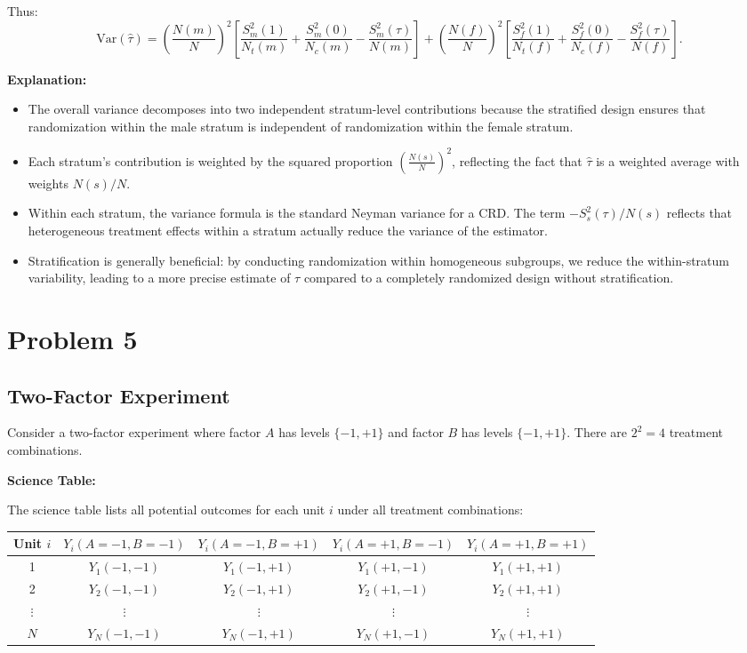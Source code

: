 \documentclass[11pt]{article}
\begin{document}
Thus:
\[
  \boxed{\text{Var}(\hat{\tau}) = \left(\frac{N(m)}{N}\right)^2 \left[\frac{S^2_m(1)}{N_t(m)} + \frac{S^2_m(0)}{N_c(m)} - \frac{S^2_m(\tau)}{N(m)}\right] + \left(\frac{N(f)}{N}\right)^2 \left[\frac{S^2_f(1)}{N_t(f)} + \frac{S^2_f(0)}{N_c(f)} - \frac{S^2_f(\tau)}{N(f)}\right].}
\]

\textbf{Explanation:}
\begin{itemize}
  \item The overall variance decomposes into two independent stratum-level contributions because the stratified design ensures that randomization within the male stratum is independent of randomization within the female stratum.
  \item Each stratum's contribution is weighted by the squared proportion $\left(\frac{N(s)}{N}\right)^2$, reflecting the fact that $\hat{\tau}$ is a weighted average with weights $N(s)/N$.
  \item Within each stratum, the variance formula is the standard Neyman variance for a CRD. The term $-S^2_s(\tau)/N(s)$ reflects that heterogeneous treatment effects within a stratum actually reduce the variance of the estimator.
  \item Stratification is generally beneficial: by conducting randomization within homogeneous subgroups, we reduce the within-stratum variability, leading to a more precise estimate of $\tau$ compared to a completely randomized design without stratification.
\end{itemize}

\newpage
\section*{Problem 5}

\subsection*{Two-Factor Experiment}

Consider a two-factor experiment where factor $A$ has levels $\{-1, +1\}$ and factor $B$ has levels $\{-1, +1\}$. There are $2^2 = 4$ treatment combinations.

\textbf{Science Table:}

The science table lists all potential outcomes for each unit $i$ under all treatment combinations:

\begin{center}
\begin{tabular}{c|cccc}
\toprule
Unit $i$ & $Y_i(A=-1, B=-1)$ & $Y_i(A=-1, B=+1)$ & $Y_i(A=+1, B=-1)$ & $Y_i(A=+1, B=+1)$ \\
\midrule
1 & $Y_1(-1,-1)$ & $Y_1(-1,+1)$ & $Y_1(+1,-1)$ & $Y_1(+1,+1)$ \\
2 & $Y_2(-1,-1)$ & $Y_2(-1,+1)$ & $Y_2(+1,-1)$ & $Y_2(+1,+1)$ \\
$\vdots$ & $\vdots$ & $\vdots$ & $\vdots$ & $\vdots$ \\
$N$ & $Y_N(-1,-1)$ & $Y_N(-1,+1)$ & $Y_N(+1,-1)$ & $Y_N(+1,+1)$ \\
\bottomrule
\end{tabular}
\end{center}
\end{document}
